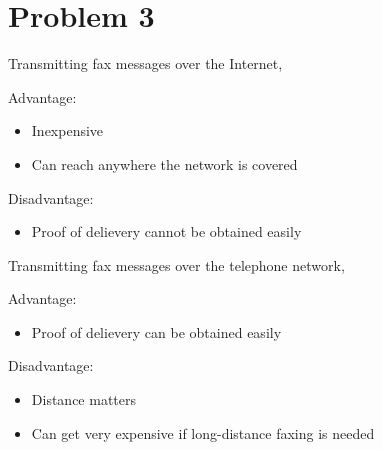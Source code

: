 \documentclass{article}
\begin{document}
\section*{Problem 3}
	Transmitting fax messages over the Internet, \newline
	\begin{addmargin}[1em]{1em}
		Advantage:
		\begin{itemize}
			\item Inexpensive
			\item Can reach anywhere the network is covered
		\end{itemize}
		Disadvantage:
		\begin{itemize}
			\item Proof of delievery cannot be obtained easily
		\end{itemize}
	\end{addmargin}

	Transmitting fax messages over the telephone network, \newline
	\begin{addmargin}[1em]{1em}
		Advantage:
		\begin{itemize}
			\item Proof of delievery can be obtained easily
		\end{itemize}
		Disadvantage:
		\begin{itemize}
			\item Distance matters
			\item Can get very expensive if long-distance faxing is needed
		\end{itemize}
	\end{addmargin}
\end{document}
